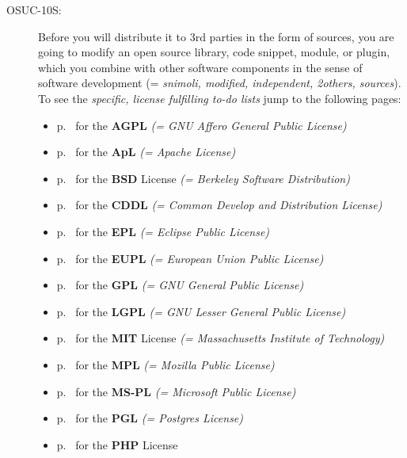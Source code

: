 \begin{description}
\item[OSUC-10S:]\label{OSUC-10S-DEF} Before you will distribute it to 3rd parties
in the form of sources, you are going to modify an open source library, code
snippet, module, or plugin, which you combine with other software components in
the sense of software development (= \textit{snimoli, modified, independent,
2others, sources}). To see the \textit{specific, license fulfilling to-do lists}
jump to the following pages:
  \begin{itemize}
    \item p.\ \pageref{OSUC-10S-AGPL} for the \textbf{AGPL}
      \textit{(= GNU Affero General Public License)} 
    \item p.\ \pageref{OSUC-10S-Apache20} for the \textbf{ApL}
      \textit{(= Apache License)}
    \item p.\ \pageref{OSUC-10S-BSD} for the \textbf{BSD} License
      \textit{(= Berkeley Software Distribution)}
    \item p.\ \pageref{OSUC-10S-CDDL} for the \textbf{CDDL}
      \textit{(= Common Develop and Distribution License)}  
    \item p.\ \pageref{OSUC-10S-EPL} for the \textbf{EPL}
      \textit{(= Eclipse Public License)}     
    \item p.\ \pageref{OSUC-10S-EUPL} for the \textbf{EUPL}
      \textit{(= European Union Public License)} 
    \item p.\ \pageref{OSUC-10S-GPL} for the \textbf{GPL}
       \textit{(= GNU General Public License)} 
    \item p.\ \pageref{OSUC-10S-LGPL} for the \textbf{LGPL}
      \textit{(= GNU Lesser General Public License)}           
    \item p.\ \pageref{OSUC-10S-MIT} for the \textbf{MIT} License
       \textit{(= Massachusetts Institute of Technology)} 
    \item p.\ \pageref{OSUC-10S-MPL} for the \textbf{MPL}
      \textit{(= Mozilla Public License)}     
    \item p.\ \pageref{OSUC-10S-MS-PL} for the \textbf{MS-PL}
      \textit{(= Microsoft Public License)} 
    \item p.\ \pageref{OSUC-10S-PGL} for the \textbf{PGL}
      \textit{(= Postgres License)} 
    \item p.\ \pageref{OSUC-10S-PHP} for the \textbf{PHP} License 
  \end{itemize}


\end{description}
